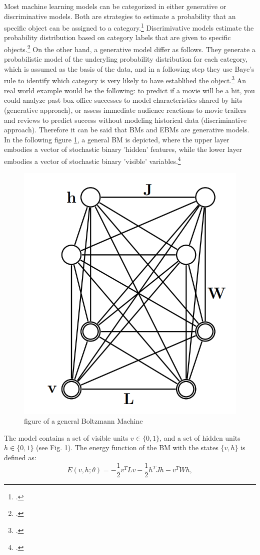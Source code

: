 Most machine learning models can be categorized in either generative or discriminative models. Both are strategies to estimate a probability that an specific object can be assigned to a category.\footcite[cf.][1]{hsuEffectsGenerativeDiscriminative2010}
Discrimivative models estimate the probability distribution based on category labels that are given to specific objects.\footcite[cf.][2]{gmComprehensiveSurveyAnalysis2020}
On the other hand, a generative model differ as follows. 
They generate a probabilistic model of the underyling probability distribution for each category, which is assumed as the basis of the data, and in a following step they use Baye's rule to identify which category is very likely to have establihed the object.\footcite[cf.][1]{hsuEffectsGenerativeDiscriminative2010}
An real world example would be the following: to predict if a movie will be a hit, you could analyze past box office successes to model characteristics shared by hits (generative approach), or assess immediate audience reactions to movie trailers and reviews to predict success without modeling historical data (discriminative approach).
Therefore it can be said that \ac{BM}s and \ac{EBM}s are generative models. In the following figure \ref{fig1}, a general \ac{BM} is depicted, where the upper layer embodies a vector of stochastic binary 'hidden' features, while the lower layer embodies a vector of stochastic binary 'visible' variables.\footcite[cf.][449]{salakhutdinovDeepBoltzmannMachines2009}

\begin{figure}[H]
    \centering
    \includegraphics[width=0.25\linewidth]{graphics/General_BM.png}
    \caption{figure of a general Boltzmann Machine}
    \label{fig1}
\end{figure}
The model contains a set of visible units \( v \in \{0, 1\} \), and a set of hidden units \( h \in \{0, 1\} \) (see Fig. 1). The energy function of the \ac{BM} with the states \( \{v, h\} \) is defined as:
\begin{equation}
E(v, h; \theta) = -\frac{1}{2} v^T L v - \frac{1}{2} h^T J h - v^T W h,
\end{equation}

